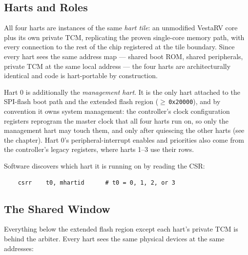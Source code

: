 \subsection{Harts and Roles}

All four harts are instances of the same \textit{hart tile}: an unmodified VestaRV core plus its own private TCM, replicating the proven single-core memory path, with every connection to the rest of the chip registered at the tile boundary. Since every hart sees the same address map --- shared boot ROM, shared peripherals, private TCM at the same local address --- the four harts are architecturally identical and code is hart-portable by construction.

Hart 0 is additionally the \textit{management hart}. It is the only hart attached to the SPI-flash boot path and the extended flash region ($\geq$\,\texttt{0x20000}), and by convention it owns system management: the  controller's clock configuration registers reprogram the master clock that all four harts run on, so only the management hart may touch them, and only after quiescing the other harts (see the  chapter). Hart 0's peripheral-interrupt enables and priorities also come from the  controller's legacy registers, where harts 1--3 use their  rows.

Software discovers which hart it is running on by reading the  CSR:

\begin{verbatim}
    csrr    t0, mhartid      # t0 = 0, 1, 2, or 3
\end{verbatim}



\subsection{The Shared Window}

Everything below the extended flash region except each hart's private TCM is behind the arbiter. Every hart sees the same physical devices at the same addresses:

